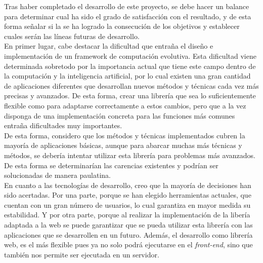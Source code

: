 

Tras haber completado el desarrollo de este proyecto, se debe hacer un balance para determinar cual ha sido el grado de satisfacción con el resultado, y de esta forma señalar si la se ha logrado la consecución de los objetivos y establecer cuales serán las líneas futuras de desarrollo.  \\

En primer lugar, cabe destacar la dificultad que entraña el diseño e implementación de un framework de computación evolutiva. Esta dificultad viene determinada sobretodo por la importancia actual que tiene este campo dentro de la computación y la inteligencia artificial, por lo cual existen una gran cantidad de aplicaciones diferentes que desarrollan nuevos métodos y técnicas cada vez más precisas y avanzados. De esta forma, crear una librería que sea lo suficientemente flexible como para adaptarse correctamente a estos cambios, pero que a la vez disponga de una implementación concreta para las funciones más comunes entraña dificultades muy importantes. \\

De esta forma, considero que los métodos y técnicas implementados cubren la mayoría de aplicaciones básicas, aunque para abarcar muchas más técnicas y métodos, se debería intentar utilizar esta librería para problemas más avanzados. De esta forma se determinarían las carencias existentes y podrían ser solucionadas de manera paulatina. \\

En cuanto a las tecnologías de desarrollo, creo que la mayoría de decisiones han sido acertadas. Por una parte, porque se han elegido herramientas actuales, que cuentan con un gran número de usuarios, lo cual garantiza en mayor medida su estabilidad. Y por otra parte, porque al realizar la implementación de la libería adaptada a la web se puede garantizar que se pueda utilizar esta librería con las aplicaciones que se desarrollen en un futuro. Además, el desarrollo como librería web, es el más flexible pues ya no solo podrá ejecutarse en el \textit{front-end}, sino que también nos permite ser ejecutada en un servidor. \\

